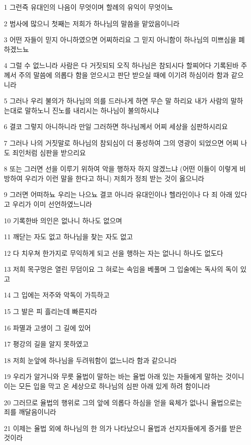 \par 1 그런즉 유대인의 나음이 무엇이며 할례의 유익이 무엇이뇨
\par 2 범사에 많으니 첫째는 저희가 하나님의 말씀을 맡았음이니라
\par 3 어떤 자들이 믿지 아니하였으면 어찌하리요 그 믿지 아니함이 하나님의 미쁘심을 폐하겠느뇨
\par 4 그럴 수 없느니라 사람은 다 거짓되되 오직 하나님은 참되시다 할찌어다 기록된바 주께서 주의 말씀에 의롭다 함을 얻으시고 판단 받으실 때에 이기려 하심이라 함과 같으니라
\par 5 그러나 우리 불의가 하나님의 의를 드러나게 하면 무슨 말 하리요 내가 사람의 말하는대로 말하노니 진노를 내리시는 하나님이 불의하시냐
\par 6 결코 그렇지 아니하니라 만일 그러하면 하나님께서 어찌 세상을 심판하시리요
\par 7 그러나 나의 거짓말로 하나님의 참되심이 더 풍성하여 그의 영광이 되었으면 어찌 나도 죄인처럼 심판을 받으리요
\par 8 또는 그러면 선을 이루기 위하여 악을 행하자 하지 않겠느냐 (어떤 이들이 이렇게 비방하여 우리가 이런 말을 한다고 하니) 저희가 정죄 받는 것이 옳으니라
\par 9 그러면 어떠하뇨 우리는 나으뇨 결코 아니라 유대인이나 헬라인이나 다 죄 아래 있다고 우리가 이미 선언하였느니라
\par 10 기록한바 의인은 없나니 하나도 없으며
\par 11 깨닫는 자도 없고 하나님을 찾는 자도 없고
\par 12 다 치우쳐 한가지로 무익하게 되고 선을 행하는 자는 없나니 하나도 없도다
\par 13 저희 목구멍은 열린 무덤이요 그 혀로는 속임을 베풀며 그 입술에는 독사의 독이 있고
\par 14 그 입에는 저주와 악독이 가득하고
\par 15 그 발은 피 흘리는데 빠른지라
\par 16 파멸과 고생이 그 길에 있어
\par 17 평강의 길을 알지 못하였고
\par 18 저희 눈앞에 하나님을 두려워함이 없느니라 함과 같으니라
\par 19 우리가 알거니와 무릇 율법이 말하는 바는 율법 아래 있는 자들에게 말하는 것이니 이는 모든 입을 막고 온 세상으로 하나님의 심판 아래 있게 하려 함이니라
\par 20 그러므로 율법의 행위로 그의 앞에 의롭다 하심을 얻을 육체가 없나니 율법으로는 죄를 깨달음이니라
\par 21 이제는 율법 외에 하나님의 한 의가 나타났으니 율법과 선지자들에게 증거를 받은 것이라
